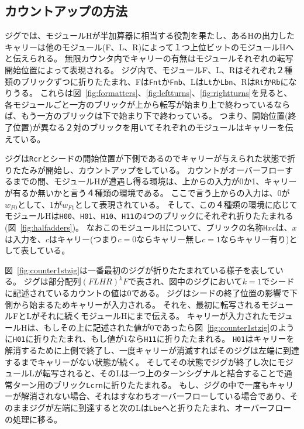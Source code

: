 \documentclass[a4,11pt]{article}
\begin{document}
%
\newpage
%

\subsection{カウントアップの方法}
ジグでは、モジュールHが半加算器に相当する役割を果たし、あるHの出力したキャリーは他のモジュール(F、L、R)によって１つ上位ビットのモジュールHへと伝えられる。
無限カウンタ内でキャリーの有無はモジュールそれぞれの転写開始位置によって表現される。
ジグ内で、モジュールF、L、Rはそれぞれ２種類のブリックずつに折りたたまれ、Fは\texttt{Fnt}か\texttt{Fnb}、Lは\texttt{Lt}か\texttt{Lbn}、Rは\texttt{Rt}か\texttt{Rb}になりうる。
これらは図~\ref{fig:formatters}、\ref{fig:leftturns}、\ref{fig:rightturns}を見ると、各モジュールごと一方のブリックが上から転写が始まり上で終わっているならば、もう一方のブリックは下で始まり下で終わっている。
つまり、開始位置(終了位置)が異なる２対のブリックを用いてそれぞれのモジュールはキャリーを伝えている。

ジグは\texttt{Rcr}とシードの開始位置が下側であるのでキャリーが与えられた状態で折りたたみが開始し、カウントアップをしている。
カウントがオーバーフローするまでの間、モジュールHが遭遇し得る環境は、上からの入力が0か1、キャリーが有るか無いかと言う４種類の環境である。
ここで言う上からの入力は、0が$w_{F0}$として、1が$w_{F1}$として表現されている。
そして、この４種類の環境に応じてモジュールHは\texttt{H00}、\texttt{H01}、\texttt{H10}、\texttt{H11}の4つのブリックにそれぞれ折りたたまれる(図~\ref{fig:halfadders})。
なおこのモジュールHについて、ブリックの名称\texttt{H}$xc$は、$x$は入力を、$c$はキャリー(つまり$c=0$ならキャリー無し$c=1$ならキャリー有り)として表している。

図~\ref{fig:counter1stzig}は一番最初のジグが折りたたまれている様子を表している。
ジグは部分配列$(FLHR)^kF$で表され、図中のジグにおいて$k=1$でシードに記述されているカウントの値は$0$である。
ジグはシードの終了位置の影響で下側から始まるためキャリーが入力される。
それを、最初に転写されるモジュールFとLがそれに続くモジュールHにまで伝える。
キャリーが入力されたモジュールHは、もしその上に記述された値が$0$であったら図~\ref{fig:counter1stzig}のように\texttt{H01}に折りたたまれ、もし値が$1$なら\texttt{H11}に折りたたまれる。
\texttt{H01}はキャリーを解消するために上側で終了し、一度キャリーが消滅すればそのジグは左端に到達するまでキャリーがない状態が続く。
そしてその状態でジグが終了し次にモジュールLが転写されると、そのLは一つ上のターンシグナルと結合することで通常ターン用のブリック\texttt{Lcrn}に折りたたまれる。
もし、ジグの中で一度もキャリーが解消されない場合、それはすなわちオーバーフローしている場合であり、そのままジグが左端に到達すると次のLは\texttt{Lbe}へと折りたたまれ、オーバーフローの処理に移る。
\end{document}

